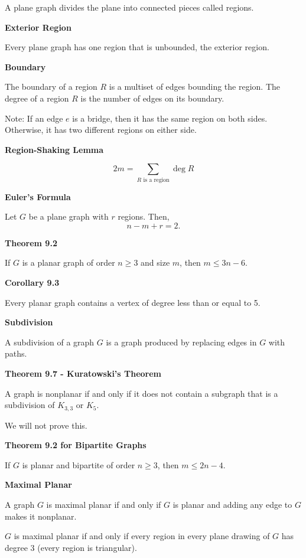 \documentclass{article}
\begin{document}
    A plane graph divides the plane into connected pieces called regions.

\medskip\noindent\textbf{Exterior Region}

    Every plane graph has one region that is unbounded, the exterior region.

\medskip\noindent\textbf{Boundary}

    The boundary of a region $R$ is a multiset of edges bounding the region.
    The degree of a region $R$ is the number of edges on its boundary.
    
    Note: If an edge $e$ is a bridge, then it has the same region on both sides. Otherwise, it has two different regions on either side.

\medskip\noindent\textbf{Region-Shaking Lemma}

    $$2m = \sum_{R \text{ is a region}} \deg R$$

\medskip\noindent\textbf{Euler's Formula}

    Let $G$ be a plane graph with $r$ regions.
    Then, $$n - m + r = 2.$$

\medskip\noindent\textbf{Theorem 9.2}

    If $G$ is a planar graph of order $n \geq 3$ and size $m$, then $m \leq 3n - 6$.

\medskip\noindent\textbf{Corollary 9.3}

    Every planar graph contains a vertex of degree less than or equal to 5.

\medskip\noindent\textbf{Subdivision}

    A subdivision of a graph $G$ is a graph produced by replacing edges in $G$ with paths.

\medskip\noindent\textbf{Theorem 9.7 - Kuratowski's Theorem}

    A graph is nonplanar if and only if it does not contain a subgraph that is a subdivision of $K_{3,3}$ or $K_5$.

    We will not prove this.

\medskip\noindent\textbf{Theorem 9.2 for Bipartite Graphs}

    If $G$ is planar and bipartite of order $n \geq 3$, then $m \leq 2n - 4$.

\medskip\noindent\textbf{Maximal Planar}

    A graph $G$ is maximal planar if and only if $G$ is planar and adding any edge to $G$ makes it nonplanar.

    $G$ is maximal planar if and only if every region in every plane drawing of $G$ has degree 3 (every region is triangular).
\end{document}
